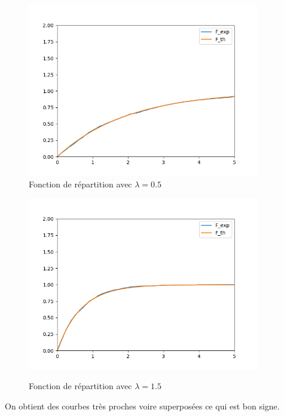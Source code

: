 \documentclass[12,french]{report}
\begin{document}
\begin{figure}[H]
    \begin{minipage}[c]{.50\linewidth}
        \centering
        \includegraphics[width=0.9\textwidth]{./Images/Lambda_0.5}\\
        \caption*{Fonction de répartition avec $\lambda=0.5$}
    \end{minipage}
    \hfill%
    \begin{minipage}[c]{.50\linewidth}
        \centering
        \includegraphics[width=0.9\textwidth]{./Images/Lambda_1.5}\\
        \caption*{Fonction de répartition avec $\lambda=1.5$}
    \end{minipage}
\end{figure}\vspace{0.3cm}

On obtient des courbes très proches voire superposées ce qui est bon signe.\\
\end{document}
